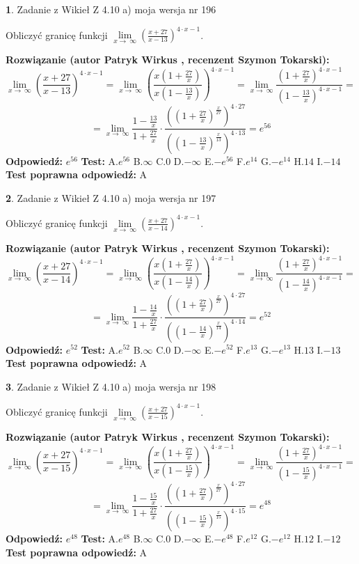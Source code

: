 \documentclass[12pt, a4paper]{article}
\theoremstyle{definition} %
\newtheorem{zad}{}
\newcommand{\zadStart}[1]{\begin{zad}#1\newline}
\newcommand{\zadStop}{\end{zad}}
\newcommand{\rozwStart}[2]{\noindent \textbf{Rozwiązanie (autor #1 , recenzent #2): }\newline}
\newcommand{\rozwStop}{\newline}
\newcommand{\odpStart}{\noindent \textbf{Odpowiedź:}\newline}
\newcommand{\odpStop}{\newline}
\newcommand{\testStart}{\noindent \textbf{Test:}\newline}
\newcommand{\testStop}{\newline}
\newcommand{\kluczStart}{\noindent \textbf{Test poprawna odpowiedź:}\newline}
\newcommand{\kluczStop}{\newline}
\begin{document}
\zadStart{Zadanie z Wikieł Z 4.10 a) moja wersja nr 196}

Obliczyć granicę funkcji  $\lim\limits_{x\to\ \infty}(\frac{x+27}{x-13})^{4\cdot x-1}$.
\zadStop
\rozwStart{Patryk Wirkus}{Szymon Tokarski}
$$\lim\limits_{x\to\ \infty}(\frac{x+27}{x-13})^{4\cdot x-1} = \lim\limits_{x\to\ \infty}(\frac{x(1+\frac{27}{x})}{x(1-\frac{13}{x})})^{4\cdot x-1}=\lim\limits_{x\to\ \infty}\frac{(1+\frac{27}{x})^{4\cdot x-1}}{(1-\frac{13}{x})^{4\cdot x-1}}=$$
$$=\lim\limits_{x\to\ \infty}\frac{1-\frac{13}{x}}{1+\frac{27}{x}}\cdot\frac{((1+\frac{27}{x})^{\frac{x}{27}})^{4\cdot27}}{((1-\frac{13}{x})^{\frac{x}{13}})^{4\cdot13}}=e^{56}$$
\rozwStop
\odpStart
$e^{56}$
\odpStop
\testStart
A.$e^{56}$ B.$\infty$ C.$0$ D.$-\infty$ E.$-e^{56}$
F.$e^{14}$ G.$-e^{14}$
H.$14$
I.$-14$
\testStop
\kluczStart
A
\kluczStop



\zadStart{Zadanie z Wikieł Z 4.10 a) moja wersja nr 197}

Obliczyć granicę funkcji  $\lim\limits_{x\to\ \infty}(\frac{x+27}{x-14})^{4\cdot x-1}$.
\zadStop
\rozwStart{Patryk Wirkus}{Szymon Tokarski}
$$\lim\limits_{x\to\ \infty}(\frac{x+27}{x-14})^{4\cdot x-1} = \lim\limits_{x\to\ \infty}(\frac{x(1+\frac{27}{x})}{x(1-\frac{14}{x})})^{4\cdot x-1}=\lim\limits_{x\to\ \infty}\frac{(1+\frac{27}{x})^{4\cdot x-1}}{(1-\frac{14}{x})^{4\cdot x-1}}=$$
$$=\lim\limits_{x\to\ \infty}\frac{1-\frac{14}{x}}{1+\frac{27}{x}}\cdot\frac{((1+\frac{27}{x})^{\frac{x}{27}})^{4\cdot27}}{((1-\frac{14}{x})^{\frac{x}{14}})^{4\cdot14}}=e^{52}$$
\rozwStop
\odpStart
$e^{52}$
\odpStop
\testStart
A.$e^{52}$ B.$\infty$ C.$0$ D.$-\infty$ E.$-e^{52}$
F.$e^{13}$ G.$-e^{13}$
H.$13$
I.$-13$
\testStop
\kluczStart
A
\kluczStop



\zadStart{Zadanie z Wikieł Z 4.10 a) moja wersja nr 198}

Obliczyć granicę funkcji  $\lim\limits_{x\to\ \infty}(\frac{x+27}{x-15})^{4\cdot x-1}$.
\zadStop
\rozwStart{Patryk Wirkus}{Szymon Tokarski}
$$\lim\limits_{x\to\ \infty}(\frac{x+27}{x-15})^{4\cdot x-1} = \lim\limits_{x\to\ \infty}(\frac{x(1+\frac{27}{x})}{x(1-\frac{15}{x})})^{4\cdot x-1}=\lim\limits_{x\to\ \infty}\frac{(1+\frac{27}{x})^{4\cdot x-1}}{(1-\frac{15}{x})^{4\cdot x-1}}=$$
$$=\lim\limits_{x\to\ \infty}\frac{1-\frac{15}{x}}{1+\frac{27}{x}}\cdot\frac{((1+\frac{27}{x})^{\frac{x}{27}})^{4\cdot27}}{((1-\frac{15}{x})^{\frac{x}{15}})^{4\cdot15}}=e^{48}$$
\rozwStop
\odpStart
$e^{48}$
\odpStop
\testStart
A.$e^{48}$ B.$\infty$ C.$0$ D.$-\infty$ E.$-e^{48}$
F.$e^{12}$ G.$-e^{12}$
H.$12$
I.$-12$
\testStop
\kluczStart
A
\kluczStop
\end{document}
